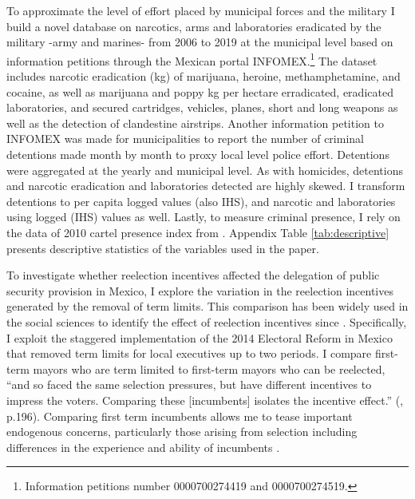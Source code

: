 \documentclass[12pt]{amsart}
\makeatletter
\def\section{\@startsection{section}{1}
	\z@{1.0\linespacing\@plus\linespacing}{.5\linespacing}{\Large}}
\numberwithin{equation}{section}
\theoremstyle{definition}
\theoremstyle{definition}
\theoremstyle{definition}
\makeatother
\begin{document}
To approximate the level of effort placed by municipal forces and the military I build a novel database on narcotics, arms and laboratories eradicated by the military -army and marines- from 2006 to 2019 at the municipal level  based on information petitions through the Mexican portal INFOMEX.\footnote{Information petitions number 0000700274419 and 0000700274519.} The dataset includes narcotic eradication (kg) of marijuana, heroine, methamphetamine, and cocaine, as well as marijuana and poppy kg per hectare erradicated, eradicated laboratories, and secured cartridges, vehicles, planes, short and long weapons as well as the detection of clandestine airstrips. %
Another information petition to INFOMEX was made for municipalities to report the number of criminal detentions made month by month to proxy local level police effort. Detentions were aggregated at the yearly and municipal level. As with homicides, detentions and narcotic eradication and laboratories detected are highly skewed. I transform detentions to per capita logged values (also IHS), and narcotic and laboratories using logged (IHS) values as well. Lastly, to measure criminal presence, I rely on the data of 2010 cartel presence index from \citet{camilo_etal_2018}. 
 Appendix Table \ref{tab:descriptive} presents descriptive statistics of the variables used in the paper.

\section{Research Design \label{sec:design}}  

To investigate whether reelection incentives affected the delegation of public security provision in Mexico, I explore the variation in the reelection incentives generated by the removal of term limits. This comparison has been widely used in the social sciences to identify the effect of reelection incentives since \citet{Besley_case_1995}. Specifically, I exploit the staggered implementation of the 2014 Electoral Reform in Mexico that removed term limits for local executives up to two periods. I compare first-term mayors who are term limited to first-term mayors who can be reelected, ``and so faced the same selection pressures, but have different incentives to impress the voters. Comparing these [incumbents] isolates the incentive effect.'' (\citet{ashworth_2012}, p.196). Comparing first term incumbents allows me to tease important endogenous concerns, particularly those arising from selection including differences in the experience and ability of incumbents \citep{ferraz_finan_2011}. 
   
\end{document}
